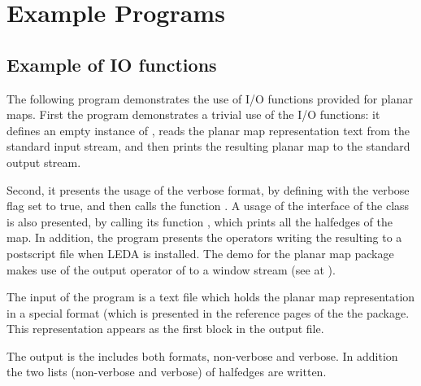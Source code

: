 
\section{Example Programs}

\subsection{Example of IO functions}
\label{PM_sec:example9}

The following program demonstrates the use of I/O functions provided
for planar maps. 
First the program demonstrates a trivial use of the I/O functions: 
it defines an empty instance of , 
reads the planar map representation text from the standard input stream, 
and then prints the resulting planar map to the standard output stream.

Second, it presents the usage of the verbose format, 
by defining  with the verbose flag set to true, 
and then calls the function .
A usage of the interface of the class  is also
presented, by calling its function , which
prints all the halfedges of the map. In addition, the program presents
the operators writing the resulting   to a postscript
file when LEDA is installed. The demo for the planar map package makes
use of the output operator of  to a
window stream  (see at  ).   



The input of the program is a text file which holds the planar map
representation in a special format (which is presented in the
reference pages of the the  package.
This representation appears as the first block in the output file.
 

The output is the  includes both formats, non-verbose
and verbose. In addition the two lists (non-verbose and verbose) of
halfedges are written.
